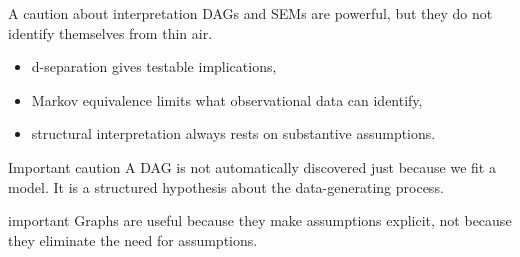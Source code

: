 \documentclass[dvipsnames,aspectratio=169,handout]{beamer}
\begin{document}
%
%

\begin{frame}{A caution about interpretation}
DAGs and SEMs are powerful, but they do not identify themselves from thin air.

\begin{itemize}
    \item d-separation gives testable implications,
    \item Markov equivalence limits what observational data can identify,
    \item structural interpretation always rests on substantive assumptions.
\end{itemize}

\begin{alertblock}{Important caution}
A DAG is not automatically discovered just because we fit a model.
It is a structured hypothesis about the data-generating process.
\end{alertblock}

\begin{beamercolorbox}[wd=\textwidth,sep=7pt,center,rounded=true,shadow=true]{important}
Graphs are useful because they make assumptions explicit, not because they eliminate the need for assumptions.
\end{beamercolorbox}
\end{frame}
\end{document}
